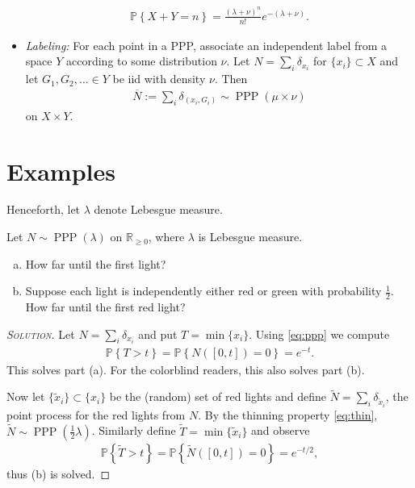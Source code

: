 \documentclass[11pt]{article}
\newenvironment{soln}{\begin{proof}[\textsc{Solution}]}{\renewcommand{\qedsymbol}{$\blacklozenge$}\end{proof}}
\begin{document}
\begin{itemize}
	\begin{align}
		\mathbb{P}\left\{ X + Y = n \right\} = \frac{(\lambda + \nu)^n}{n!}e^{-(\lambda + \nu)}.
	\end{align}
	\item \emph{Labeling:} For each point in a PPP, associate an independent label from a space $Y$ according to some distribution $\nu$. Let $N = \sum_i \delta_{x_i}$ for $\{x_i\}\subset X$ and let $G_1,G_2,\ldots \in Y$ be iid with density $\nu$. Then 
	\begin{align}\label{eq:label}
		\overline{N} := \sum_i \delta_{(x_i, G_i)} \sim \operatorname{PPP}(\mu\times\nu)
	\end{align}
	on $X\times Y$.
\end{itemize}
\section{Examples}
Henceforth, let $\lambda$ denote Lebesgue measure.
\begin{example}
	Let $N\sim \operatorname{PPP}(\lambda)$ on $\mathbb{R}_{\geq 0}$, where $\lambda$ is Lebesgue measure.
	\begin{enumerate}[(a)]
		\item How far until the first light?
		\item Suppose each light is independently either red or green with probability $\frac{1}{2}$. How far until the first red light?
	\end{enumerate}
	\begin{soln}
		Let $N = \sum_i \delta_{x_i}$ and put $T = \min\{x_i\}$. Using \eqref{eq:ppp} we compute
		\begin{align}
			\mathbb{P}\left\{ T > t \right\} = \mathbb{P}\left\{ N([0,t]) = 0 \right\} = e^{-t}.
		\end{align}
		This solves part (a). For the colorblind readers, this also solves part (b). 
		
		Now let $\{\tilde{x}_i\}\subset \{x_i\}$ be the (random) set of red lights and define $\widetilde{N} = \sum_i \delta_{\tilde{x}_i}$, the point process for the red lights from $N$. By the thinning property \eqref{eq:thin}, $\widetilde{N} \sim \operatorname{PPP}\left(\frac{1}{2}\lambda\right)$. Similarly define $\widetilde{T} = \min\{\tilde{x}_i\}$ and observe
		\begin{align}
			\mathbb{P}\left\{ \widetilde{T} > t\right\} = \mathbb{P}\left\{ \widetilde{N}([0,t]) = 0 \right\} = e^{-t/2},
		\end{align}
		thus (b) is solved.
	\end{soln}
\end{example}
\end{document}
